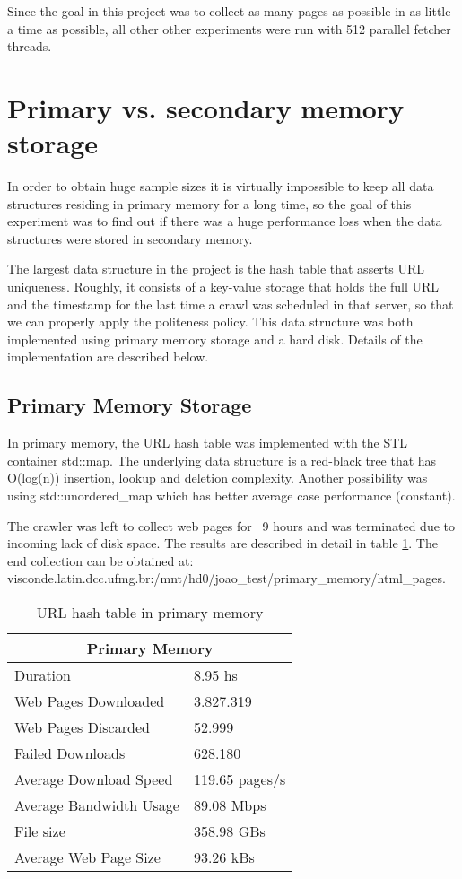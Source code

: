 \documentclass{report}
\begin{document}
Since the goal in this project was to collect as many pages as possible in as little a time as possible, all other
other experiments were run with 512 parallel fetcher threads.

\section{Primary vs. secondary memory storage}
In order to obtain huge sample sizes it is virtually impossible to keep all data structures residing in 
primary memory for a long time, so the goal of this experiment was to find out if there was a huge performance loss 
when the data structures were stored in secondary memory.

The largest data structure in the project is the hash table that asserts URL uniqueness. Roughly, it consists
of a key-value storage that holds the full URL and the timestamp for the last time a crawl was scheduled in that
server, so that we can properly apply the politeness policy. This data structure was both implemented using primary
memory storage and a hard disk. Details of the implementation are described below.

\subsection{Primary Memory Storage}

In primary memory, the URL hash table was implemented with the STL container std::map. The underlying data structure is a
red-black tree that has O(log(n)) insertion, lookup and deletion complexity. Another possibility was using std::unordered\_map
which has better average case performance (constant).

The crawler was left to collect web pages for ~9 hours and was terminated due to incoming lack of disk space. The results are described
in detail in table \ref{tab:primarymemory}. The end collection can be obtained at: \\
visconde.latin.dcc.ufmg.br:/mnt/hd0/joao\_test/primary\_memory/html\_pages.

\begin{table}
\centering
\begin{tabular}{ |l|l| }
  \hline
  \multicolumn{2}{|c|}{Primary Memory} \\
  \hline
  Duration & 8.95 hs \\
  Web Pages Downloaded & 3.827.319 \\
  Web Pages Discarded & 52.999 \\
  Failed Downloads & 628.180 \\
  Average Download Speed & 119.65 pages/s \\
  Average Bandwidth Usage & 89.08 Mbps \\
  File size & 358.98 GBs \\
  Average Web Page Size & 93.26 kBs \\
  \hline
\end{tabular}
\caption{URL hash table in primary memory}
\label{tab:primarymemory}
\end{table}
\end{document}
